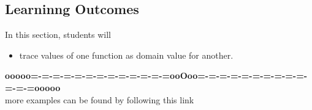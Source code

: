 \documentclass{ximera}
\begin{document}
\subsection{Learninng Outcomes}


\begin{sectionOutcomes}
In this section, students will 

\begin{itemize}
\item trace values of one function as domain value for another.

\end{itemize}
\end{sectionOutcomes}











\begin{center}
\textbf{\textcolor{green!50!black}{ooooo=-=-=-=-=-=-=-=-=-=-=-=-=ooOoo=-=-=-=-=-=-=-=-=-=-=-=-=ooooo}} \\

more examples can be found by following this link\\ 

\end{center}
\end{document}
